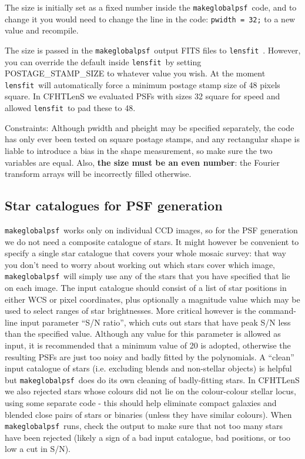 \documentclass{article}
\def\lensfit{{\tt lensfit}\ }
\def\makeglobalpsf{{\tt makeglobalpsf}\ }
\begin{document}
The size is initially set as a fixed number inside the \makeglobalpsf code, and to change it you
would need to change the line in the code: {\tt pwidth = 32;}
to a new value and recompile.  

The size is passed in the \makeglobalpsf output FITS files to \lensfit.  
However, you can override the default inside \lensfit by
setting POSTAGE\_STAMP\_SIZE
to whatever value you wish. At the moment \lensfit will automatically force a minimum postage stamp
size of 48 pixels square.  In CFHTLenS we evaluated PSFs with sizes 32 square for speed and allowed
\lensfit to pad these to 48.

Constraints:  Although pwidth and pheight may be specified separately, 
the code has only ever been tested on square postage stamps, and any rectangular shape 
is liable to introduce a bias in the shape measurement, so make sure the two variables are equal.  
Also, {\bf the size must be an even number}: the Fourier transform arrays will be incorrectly filled
otherwise.  

\subsection{Star catalogues for PSF generation}

\makeglobalpsf works only on individual CCD images, so for the PSF generation we do not need a 
composite catalogue of stars.  It might however be convenient to specify a single star catalogue that
covers your whole mosaic survey: that way you don't need to worry about working out which stars
cover which image, \makeglobalpsf will simply use any of the stars that you have specified that
lie on each image.
The input catalogue should consist of a list of star
positions in either WCS or pixel coordinates, plus optionally a magnitude value which may be used to
select ranges of star brightnesses.  
More critical however is the command-line input parameter ``S/N ratio'',
which cuts out stars that have peak S/N less than the specified value.  Although any value 
for this parameter is allowed as input, it is recommended that a minimum value
of 20 is adopted, otherwise the resulting PSFs are just too noisy and badly fitted by the
polynomials.  A ``clean'' input catalogue of stars (i.e. excluding blends and non-stellar objects)
is helpful but \makeglobalpsf does do its own cleaning of badly-fitting stars.  
In CFHTLenS we also rejected stars whose colours did not lie on the colour-colour stellar locus,
using some separate code - this should help eliminate compact galaxies and blended close pairs of
stars or binaries (unless they have similar colours).
When \makeglobalpsf runs, check the output to make sure that not 
too many stars have been rejected (likely a sign of a bad input catalogue, bad positions, or too low a
cut in S/N).
\end{document}

